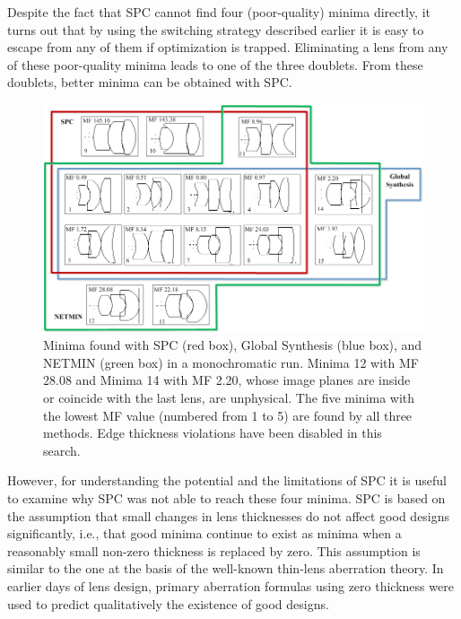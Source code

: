 Despite the fact that SPC cannot find four (poor-quality) minima directly, it turns out that by using the switching strategy described earlier it is easy to escape from any of them if optimization is trapped. Eliminating a lens from any of these poor-quality minima leads to one of the three doublets. From these doublets, better minima can be obtained with SPC.
\begin{figure}[h!]
    \centering
    \includegraphics[width=1.0\textwidth]{chapter-3/figures/TripletMoNoNetwork.png}
    \caption{Minima found with SPC (red box), Global Synthesis (blue box), and NETMIN (green box) in a monochromatic run. Minima 12 with MF 28.08 and Minima 14 with MF 2.20, whose image planes are inside or coincide with the last lens, are unphysical. The five minima with the lowest MF value (numbered from 1 to 5) are found by all three methods. Edge thickness violations have been disabled in this search.}
    \label{fig:TripletMonoNetwork}
\end{figure}

However, for understanding the potential and the limitations of SPC it is useful to examine why SPC was not able to reach these four minima. SPC is based on the assumption that small changes in lens thicknesses do not affect good designs significantly, i.e., that good minima continue to exist as minima when a reasonably small non-zero thickness is replaced by zero. This assumption is similar to the one at the basis of the well-known thin-lens aberration theory. In earlier days of lens design, primary aberration formulas using zero thickness were used to predict qualitatively the existence of good designs.

